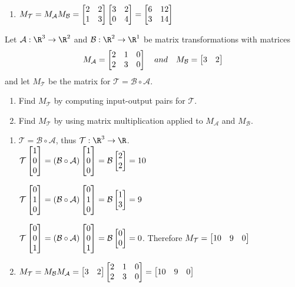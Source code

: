 \begin{exercises}
\begin{problist}
\begin{solution}
\begin{enumerate}
				\item $M_{\mathcal T}= M_{\mathcal
					A}M_{\mathcal B}=
					\mat{2&2\\1&3}\mat{3&2\\0&4}=
					\mat{6&12\\3&14}$
			\end{enumerate}
		\end{solution}

		\prob Let $\mathcal A: \R^{3}\to \R^{2}$ and
		$\mathcal B: \R^{2}\to \R^{1}$ be matrix transformations
		with matrices
		\[
			M_{\mathcal A}= \mat{2&1&0\\2&3&0}\quad
			and \quad M_{\mathcal B}= \mat{3&2}
		\]
		 and let $M_{\mathcal T}$ be the matrix for $\mathcal
		T=\mathcal B\circ \mathcal A$.
		\begin{enumerate}
			\item Find $M_{\mathcal T}$ by computing
				input-output pairs for $\mathcal
				T$.

			\item Find $M_{\mathcal T}$ by using
				matrix multiplication applied
				to $M_{\mathcal A}$ and $M_{\mathcal
				B}$.
		\end{enumerate}


		\begin{solution}

			\begin{enumerate}
				\item $\mathcal T = \mathcal
					B \circ \mathcal A$,
					thus
					$\mathcal T : \R^{3}
					\to \R$. \\ $\mathcal
					T \mat{1\\0\\0}= (\mathcal
					B \circ \mathcal A)
					\mat{1\\0\\0}=
					\mathcal B \mat{2\\2}=
					10$

					$\mathcal T \mat{0\\1\\0}=
					(\mathcal B \circ \mathcal
					A) \mat{0\\1\\0}=
					\mathcal B \mat{1\\3}=
					9$

					$\mathcal T \mat{0\\0\\1}=
					(\mathcal B \circ \mathcal
					A) \mat{0\\0\\1}=
					\mathcal B \mat{0\\0}=
					0$. Therefore
					$M_{\mathcal T}=
					\mat{10&9&0}$

				\item $M_{\mathcal T}= M_{\mathcal
					B}M_{\mathcal A}=
					\mat{3&2}\mat{2&1&0\\2&3&0}=
					\mat{10&9&0}$
			\end{enumerate}
		\end{solution}
	\end{problist}
\end{exercises}